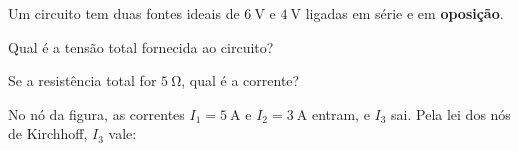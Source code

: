 \blocofixacao
\begin{questao}[1]{}

Um circuito tem duas fontes ideais de $\SI{6}{\volt}$ e $\SI{4}{\volt}$ ligadas em
série e em \textbf{oposição}.
\begin{itensq}
\item Qual é a tensão total fornecida ao circuito?
\item Se a resistência total for $\SI{5}{\ohm}$, qual é a corrente?
\end{itensq}


\end{questao}
\begin{questao}[1]{}

No nó da figura, as correntes $I_1 = \SI{5}{\ampere}$ e $I_2 = \SI{3}{\ampere}$
entram, e $I_3$ sai. Pela lei dos nós de Kirchhoff, $I_3$ vale:




\end{questao}

